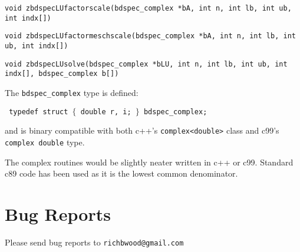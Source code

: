 \documentclass[10pt]{article}
\begin{document}
\texttt{void zbdspecLUfactorscale(bdspec\_complex *bA, int n, int lb, int ub, int indx[])}

\texttt{void zbdspecLUfactormeschscale(bdspec\_complex *bA, int n, int lb, int ub, int indx[])}

\texttt{void zbdspecLUsolve(bdspec\_complex *bLU, int n, int lb, int ub, int indx[], bdspec\_complex b[])}

\vspace{1em}

The \texttt{bdspec\_complex} type is defined:

\vspace{1em}

\texttt{ typedef struct  $\{$ double r, i; $\}$ bdspec\_complex; }

\vspace{1em}

and is binary compatible with both c++'s \texttt{complex<double>} class and
c99's \texttt{complex double} type.

The complex routines would be slightly neater written in c++ or c99.
Standard c89 code has been used as it is the lowest common denominator.

\section{Bug Reports}

Please send bug reports to \texttt{richbwood@gmail.com}
\end{document}
